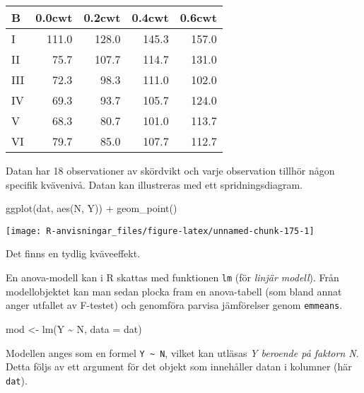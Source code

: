 \documentclass[
]{book}
\newenvironment{Shaded}{\begin{snugshade}}{\end{snugshade}}
\newcommand{\AttributeTok}[1]{\textcolor[rgb]{0.77,0.63,0.00}{#1}}
\newcommand{\FunctionTok}[1]{\textcolor[rgb]{0.00,0.00,0.00}{#1}}
\newcommand{\NormalTok}[1]{#1}
\newcommand{\OtherTok}[1]{\textcolor[rgb]{0.56,0.35,0.01}{#1}}
\newcommand{\SpecialCharTok}[1]{\textcolor[rgb]{0.00,0.00,0.00}{#1}}
\theoremstyle{definition}
\theoremstyle{definition}
\theoremstyle{definition}
\theoremstyle{definition}
\theoremstyle{remark}
\begin{document}
\begin{table}
\centering
\begin{tabular}[t]{lrrrr}
\toprule
B & 0.0cwt & 0.2cwt & 0.4cwt & 0.6cwt\\
\midrule
I & 111.0 & 128.0 & 145.3 & 157.0\\
II & 75.7 & 107.7 & 114.7 & 131.0\\
III & 72.3 & 98.3 & 111.0 & 102.0\\
IV & 69.3 & 93.7 & 105.7 & 124.0\\
V & 68.3 & 80.7 & 101.0 & 113.7\\
\addlinespace
VI & 79.7 & 85.0 & 107.7 & 112.7\\
\bottomrule
\end{tabular}
\end{table}

Datan har 18 observationer av skördvikt och varje observation tillhör någon specifik kvävenivå. Datan kan illustreras med ett spridningsdiagram.

\begin{Shaded}
\begin{Highlighting}[]
\FunctionTok{ggplot}\NormalTok{(dat, }\FunctionTok{aes}\NormalTok{(N, Y)) }\SpecialCharTok{+}
  \FunctionTok{geom\_point}\NormalTok{()}
\end{Highlighting}
\end{Shaded}

\begin{center}\texttt{[image: R-anvisningar\_files/figure-latex/unnamed-chunk-175-1]} \end{center}

Det finns en tydlig kväveeffekt.

En anova-modell kan i R skattas med funktionen \texttt{lm} (för \emph{linjär modell}). Från modellobjektet kan man sedan plocka fram en anova-tabell (som bland annat anger utfallet av F-testet) och genomföra parvisa jämförelser genom \texttt{emmeans}.

\begin{Shaded}
\begin{Highlighting}[]
\NormalTok{mod }\OtherTok{\textless{}{-}} \FunctionTok{lm}\NormalTok{(Y }\SpecialCharTok{\textasciitilde{}}\NormalTok{ N, }\AttributeTok{data =}\NormalTok{ dat)}
\end{Highlighting}
\end{Shaded}

Modellen anges som en formel \texttt{Y\ \textasciitilde{}\ N}, vilket kan utläsas \emph{Y beroende på faktorn N}. Detta följs av ett argument för det objekt som innehåller datan i kolumner (här \texttt{dat}).
\end{document}
